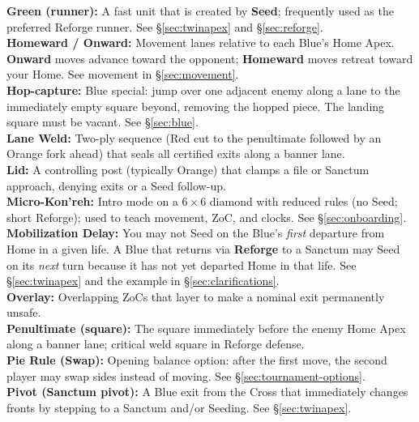 \documentclass[11pt]{article}
\begin{document}
\textbf{Green (runner):} A fast unit that is created by \textbf{Seed}; frequently used as the preferred Reforge runner. See \S\ref{sec:twinapex} and \S\ref{sec:reforge}.\\

\textbf{Homeward / Onward:} Movement lanes relative to each Blue's Home Apex. \textbf{Onward} moves advance toward the opponent; \textbf{Homeward} moves retreat toward your Home. See movement in \S\ref{sec:movement}.\\

\textbf{Hop-capture:} Blue special: jump over one adjacent enemy along a lane to the immediately empty square beyond, removing the hopped piece. The landing square must be vacant. See \S\ref{sec:blue}.\\

\textbf{Lane Weld:} Two-ply sequence (Red cut to the penultimate followed by an Orange fork ahead) that seals all certified exits along a banner lane.\\

\textbf{Lid:} A controlling post (typically Orange) that clamps a file or Sanctum approach, denying exits or a Seed follow-up.\\

\textbf{Micro-Kon'reh:} Intro mode on a 6\,$\times$\,6 diamond with reduced rules (no Seed; short Reforge); used to teach movement, ZoC, and clocks. See \S\ref{sec:onboarding}.\\

\textbf{Mobilization Delay:} You may not Seed on the Blue's \emph{first} departure from Home in a given life. A Blue that returns via \textbf{Reforge} to a Sanctum may Seed on its \emph{next} turn because it has not yet departed Home in that life. See \S\ref{sec:twinapex} and the example in \S\ref{sec:clarifications}.\\

\textbf{Overlay:} Overlapping ZoCs that layer to make a nominal exit permanently unsafe.\\

\textbf{Penultimate (square):} The square immediately before the enemy Home Apex along a banner lane; critical weld square in Reforge defense.\\

\textbf{Pie Rule (Swap):} Opening balance option: after the first move, the second player may swap sides instead of moving. See \S\ref{sec:tournament-options}.\\

\textbf{Pivot (Sanctum pivot):} A Blue exit from the Cross that immediately changes fronts by stepping to a Sanctum and/or Seeding. See \S\ref{sec:twinapex}.\\
\end{document}
